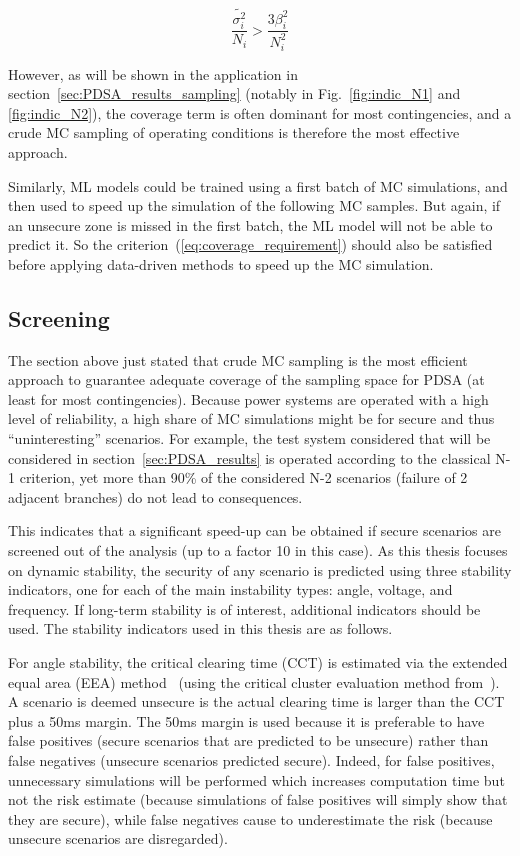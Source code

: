 \begin{equation}
  \label{eq:coverage_requirement}
  \frac{\tilde{\sigma_i^2}}{N_i} > \frac{3 \beta_i^2}{N_i^2}
\end{equation}

However, as will be shown in the application in section~\ref{sec:PDSA_results_sampling} (notably in Fig.~\ref{fig:indic_N1} and \ref{fig:indic_N2}), the coverage term is often dominant for most contingencies, and a crude MC sampling of operating conditions is therefore the most effective approach.

Similarly, ML models could be trained using a first batch of MC simulations, and then used to speed up the simulation of the following MC samples. But again, if an unsecure zone is missed in the first batch, the ML model will not be able to predict it. So the criterion~(\ref{eq:coverage_requirement}) should also be satisfied before applying data-driven methods to speed up the MC simulation.



\subsection{Screening}
\label{sec:screening}

The section above just stated that crude MC sampling is the most efficient approach to guarantee adequate coverage of the sampling space for PDSA (at least for most contingencies). Because power systems are operated with a high level of reliability, a high share of MC simulations might be for secure and thus ``uninteresting'' scenarios. For example, the test system considered that will be considered in section~\ref{sec:PDSA_results} is operated according to the classical N-1 criterion, yet more than 90\% of the considered N-2 scenarios (failure of 2 adjacent branches) do not lead to consequences.

This indicates that a significant speed-up can be obtained if secure scenarios are screened out of the analysis (up to a factor 10 in this case). As this thesis focuses on dynamic stability, the security of any scenario is predicted using three stability indicators, one for each of the main instability types: angle, voltage, and frequency. If long-term stability is of interest, additional indicators should be used. The stability indicators used in this thesis are as follows.

For angle stability, the critical clearing time (CCT) is estimated via the extended equal area (EEA) method~\cite{EqualAreaCriterionEnergies} (using the critical cluster evaluation method from~\cite{EqualAreaCriterionPSCC}). A scenario is deemed unsecure is the actual clearing time is larger than the CCT plus a 50ms margin. The 50ms margin is used because it is preferable to have false positives (\ie secure scenarios that are predicted to be unsecure) rather than false negatives (\ie unsecure scenarios predicted secure). Indeed, for false positives, unnecessary simulations will be performed which increases computation time but not the risk estimate (because simulations of false positives will simply show that they are secure), while false negatives cause to underestimate the risk (because unsecure scenarios are disregarded).


